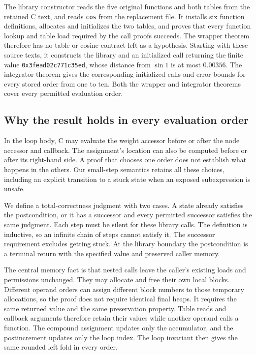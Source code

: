 \documentclass[11pt]{article}
\newcommand{\code}[1]{%
  \ifmmode\text{\texttt{\detokenize{#1}}}\else\nolinkurl{#1}\fi}
\begin{document}
The library constructor reads the five original functions and both tables
from the retained C text, and reads \code{cos} from the replacement file.
It installs six function definitions, allocates and initializes the two
tables, and proves that every function lookup and table load required by
the call proofs succeeds. The wrapper theorem therefore has no table or
cosine contract left as a hypothesis. Starting with these source texts, it
constructs the library and an initialized call returning the finite value
\code{0x3fead02c771c35ed}, whose distance from $\sin1$ is at most $0.00356$.
The integrator theorem gives the corresponding initialized calls and error
bounds for every stored order from one to ten. Both the wrapper and
integrator theorems cover every permitted evaluation order.

\subsection{Why the result holds in every evaluation order}

In the loop body, C may evaluate the weight accessor before or after the
node accessor and callback. The assignment's location can also be computed
before or after its right-hand side. A proof that chooses one order does
not establish what happens in the others. Our small-step semantics retains
all these choices, including an explicit transition to a stuck state when
an exposed subexpression is unsafe.

We define a total-correctness judgment with two cases. A state already
satisfies the postcondition, or it has a successor and every permitted
successor satisfies the same judgment. Each step must be silent for these
library calls. The definition is inductive, so an infinite chain of steps
cannot satisfy it. The successor requirement excludes getting stuck. At
the library boundary the postcondition is a terminal return with the
specified value and preserved caller memory.

The central memory fact is that nested calls leave the caller's existing
loads and permissions unchanged. They may allocate and free their own
local blocks. Different operand orders can assign different block numbers
to those temporary allocations, so the proof does not require identical
final heaps. It requires the same returned value and the same preservation
property. Table reads and callback arguments therefore retain their values
while another operand calls a function. The compound assignment updates
only the accumulator, and the postincrement updates only the loop index.
The loop invariant then gives the same rounded left fold in every order.
\end{document}
